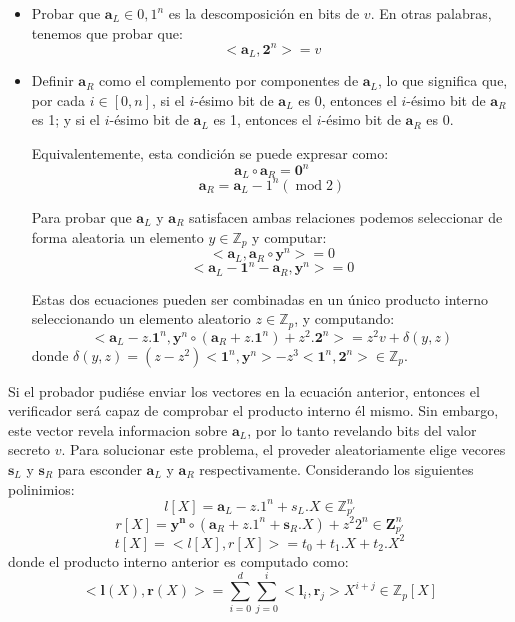 \begin{itemize}
    \item Probar que $\mathbf{a}_{L} \in {0, 1}^{n}$ es la descomposición en bits de $v$. En otras palabras, tenemos que probar que:
    $$<\mathbf{a}_{L}, \mathbf{2}^{n}> = v$$

    \item Definir $\mathbf{a}_{R}$ como el complemento por componentes de $\mathbf{a}_{L}$, lo que significa que, por cada $i \in [0, n]$, si el $i$-ésimo bit de $\mathbf{a}_{L}$ es 0, entonces el $i$-ésimo bit de $\mathbf{a}_{R}$ es 1; y si el $i$-ésimo bit de $\mathbf{a}_{L}$ es 1, entonces el $i$-ésimo bit de $\mathbf{a}_{R}$ es 0.

    Equivalentemente, esta condición se puede expresar como:
    $$\mathbf{a}_{L} \circ \mathbf{a}_{R} = \mathbf{0}^{n}$$
    $$\mathbf{a}_{R} = \mathbf{a}_{L} - 1^{n} (\operatorname{mod} 2)$$

    Para probar que $\mathbf{a}_{L}$ y $\mathbf{a}_{R}$ satisfacen ambas relaciones podemos seleccionar de forma aleatoria un elemento $y \in \mathbb{Z}_{p}$ y computar:
    $$<\mathbf{a}_{L}, \mathbf{a}_{R} \circ \mathbf{y}^{n}> = 0$$
    $$<\mathbf{a}_{L} - \mathbf{1}^{n} - \mathbf{a}_{R}, \mathbf{y}^{n}> = 0$$

    Estas dos ecuaciones pueden ser combinadas en un único producto interno seleccionando un elemento aleatorio $z \in \mathbb{Z}_{p}$, y computando:
    $$<\mathbf{a}_{L} - z.\mathbf{1}^{n}, \mathbf{y}^{n} \circ (\mathbf{a}_{R} + z.\mathbf{1}^{n}) + z^{2}.\mathbf{2}^{n}> = z^{2}v + \delta(y, z)$$
    donde $\delta(y, z) = (z - z^{2})<\mathbf{1}^{n}, \mathbf{y}^{n}> - z^{3}<\mathbf{1}^{n}, \mathbf{2}^{n}> \in \mathbb{Z}_{p}$.
\end{itemize}

Si el probador pudiése enviar los vectores en la ecuación anterior, entonces el verificador será capaz de comprobar el producto interno él mismo. Sin embargo, este vector revela informacion sobre $\mathbf{a}_{L}$, por lo tanto revelando bits del valor secreto $v$. Para solucionar este problema, el proveder aleatoriamente elige vecores $\mathbf{s}_{L}$ y $\mathbf{s}_{R}$ para esconder $\mathbf{a}_{L}$ y $\mathbf{a}_{R}$ respectivamente. Considerando los siguientes polinimios:
$$l[X] = \mathbf{a}_{L} - z.1^{n} + s_{L}.X \in \mathbb{Z}_{p'}^{n}$$
$$r[X] = \mathbf{y^{n}} \circ (\mathbf{a}_{R} + z.1^{n} + \mathbf{s}_{R}.X) + z^{2}2^{n} \in \mathbf{Z}_{p'}^{n}$$
$$t[X] = <l[X], r[X]> = t_{0} + t_{1}.X + t_{2}.X^{2}$$
donde el producto interno anterior es computado como:
$$<\mathbf{l}(X), \mathbf{r}(X)> = \sum_{i=0}^{d} \sum_{j=0}^{i} <\mathbf{l}_{i}, \mathbf{r}_{j}>X^{i+j} \in \mathbb{Z}_{p}[X]$$

